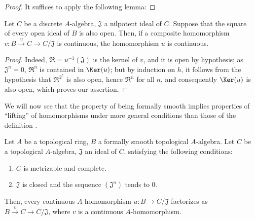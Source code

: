 \begin{proof}
It suffices to apply the following lemma:
\end{proof}

\begin{lemma}[19.3.8.1]
\label{0.19.3.8.1}
Let $C$ be a discrete $A$-algebra, $\mathfrak{J}$ a nilpotent ideal of $C$.
Suppose that the square of every open ideal of $B$ is also open.
Then, if a composite homomorphism $v:B\xrightarrow{u}C\to C/\mathfrak{J}$ is continuous, the homomorphism $u$ is continuous.
\end{lemma}

\begin{proof}
Indeed, $\mathfrak{R}=u^{-1}(\mathfrak{J})$ is the kernel of $v$, and it is open by hypothesis;
as $\mathfrak{J}^n=0$, $\mathfrak{R}^n$ is contained in $\Ker(u)$;
but by induction on $h$, it follows from the hypothesis that $\mathfrak{R}^{2^h}$ is also open, hence $\mathfrak{R}^n$ for all $n$, and consequently $\Ker(u)$ is also open, which proves our assertion.
\end{proof}

\begin{env}[19.3.9]
\label{0.19.3.9}
We will now see that the property of being formally smooth implies properties of ``lifting'' of homomorphisms under more general conditions than those of the definition .
\end{env}

\begin{proposition}[19.3.10]
\label{0.19.3.10}
Let $A$ be a topological ring, $B$ a formally smooth topological $A$-algebra.
Let $C$ be a topological $A$-algebra, $\mathfrak{J}$ an ideal of $C$, satisfying the following conditions:
\begin{enumerate}
  \item[$1^\circ$] $C$ is metrizable and complete.
  \item[$2^\circ$] $\mathfrak{J}$ is closed and the sequence $(\mathfrak{J}^n)$ tends to $0$.
\end{enumerate}
Then, every continuous $A$-homomorphism $u:B\to C/\mathfrak{J}$ factorizes as $B\xrightarrow{v}C\to C/\mathfrak{J}$, where $v$ is a continuous $A$-homomorphism.
\end{proposition}

